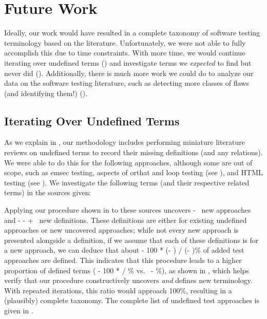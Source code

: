 \section{Future Work}\label{future-work}

Ideally, our work would have resulted in a complete taxonomy of software
testing terminology based on the literature. Unfortunately, we were not able to
fully accomplish this due to time constraints. With more time, we would
continue iterating over undefined terms () and
investigate terms we \emph{expected} to find but never did
(). Additionally, there is much more work we could do
to analyze our data on the software testing literature, such as detecting
more classes of flaws (and identifying them!) ().

\subsection{Iterating Over Undefined Terms}\label{future-undef-terms}

As we explain in , our methodology includes performing
miniature literature reviews on undefined terms to record their
missing definitions (and any relations). We were able to do this for the
following approaches, although some are out of scope, such as \acf{emsec}
testing, aspects of \acf{orthat} and loop testing (see ),
and HTML testing (see ). We investigate the following terms
(and their respective related terms) in the sources given:


Applying our procedure shown in  to these sources
uncovers \the\numexpr \TotalAfter - \TotalBefore\relax\ new approaches and
\the\numexpr \TotalAfter - \UndefAfter - \TotalBefore + \UndefBefore\relax\ new
definitions. These definitions are either for existing undefined approaches or
new uncovered approaches; while not every new approach is presented alongside
a definition, if we assume that each of these definitions is for a new approach,
we can deduce that about \the{} - 100 * (\UndefAfter - \UndefBefore) /
(\TotalAfter - \TotalBefore)\relax\% of added test approaches are defined. This
indicates that this procedure leads to a higher proportion of defined terms
(\the{} - 100 * \UndefBefore / \TotalBefore\relax\% vs.~%
\the{} - \undefPerc\relax\%), as shown in
, which helps verify that our procedure constructively
uncovers \emph{and} defines new terminology. With repeated iterations, this
ratio would approach 100\%, resulting in a (plausibly) complete taxonomy. The
complete list of undefined test approaches is given in .

